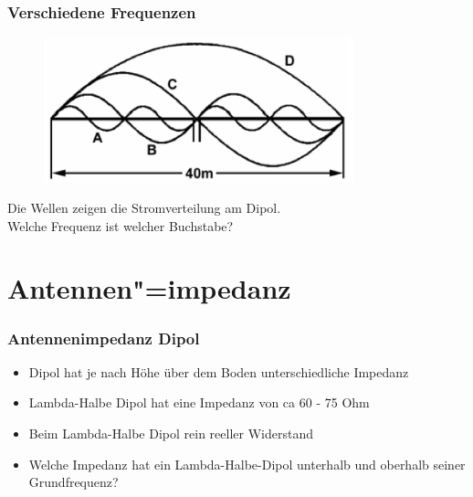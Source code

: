\begin{frame}
  \frametitle{Verschiedene Frequenzen}
  \begin{center}
    \begin{figure}
      \includegraphics[width=0.8\textwidth,height=.75\textheight,keepaspectratio]{a09/TH108.png}
    \end{figure}
    Die Wellen zeigen die Stromverteilung am Dipol. \\Welche Frequenz ist welcher Buchstabe?
  \end{center}
\end{frame}


\section*{Antennen"=impedanz}

\begin{frame}
  \frametitle{Antennenimpedanz Dipol}
  \begin{center}
    \begin{itemize}
      \item Dipol hat je nach Höhe über dem Boden unterschiedliche Impedanz \\[1em]
      \item Lambda-Halbe Dipol hat eine Impedanz von ca 60 - 75 Ohm \\[1em]
      \item Beim Lambda-Halbe Dipol rein reeller Widerstand \\[1em]
      \item Welche Impedanz hat ein Lambda-Halbe-Dipol unterhalb und oberhalb seiner Grundfrequenz? \\[1em]
    \end{itemize}
  \end{center}
\end{frame}

